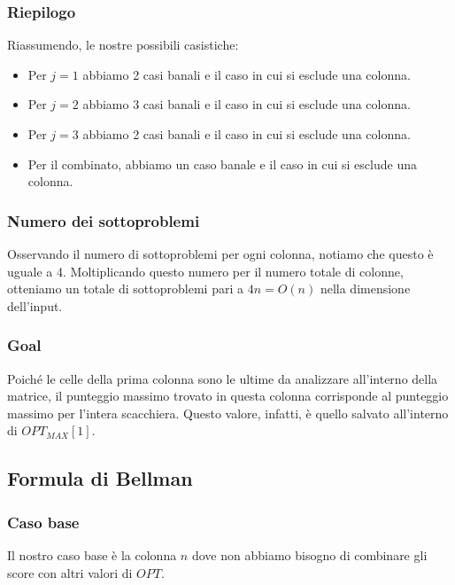 \subsubsection*{Riepilogo}

Riassumendo, le nostre possibili casistiche:

\begin{itemize}
	\item Per $j = 1$ abbiamo 2 casi banali e il caso in cui si esclude una colonna.
	\item Per $j = 2$ abbiamo 3 casi banali e il caso in cui si esclude una colonna.
	\item Per $j = 3$ abbiamo 2 casi banali e il caso in cui si esclude una colonna.
	\item Per il combinato, abbiamo un caso banale e il caso in cui si esclude una colonna.
\end{itemize}

\subsubsection*{Numero dei sottoproblemi}

Osservando il numero di sottoproblemi per ogni colonna, notiamo che questo è uguale a 4. 
Moltiplicando questo numero per il numero totale di colonne, otteniamo un totale di sottoproblemi pari a $4n = O(n)$ nella dimensione dell'input. 

\subsubsection*{Goal}

Poiché le celle della prima colonna sono le ultime da analizzare all'interno della matrice, il punteggio massimo trovato in
questa colonna corrisponde al punteggio massimo per l'intera scacchiera.
Questo valore, infatti, è quello salvato all'interno di $OPT_{MAX}[1]$.

\subsection{Formula di Bellman}


\subsubsection*{Caso base}

Il nostro caso base è la colonna $n$ dove non abbiamo bisogno di combinare gli score con altri valori di $OPT$.

